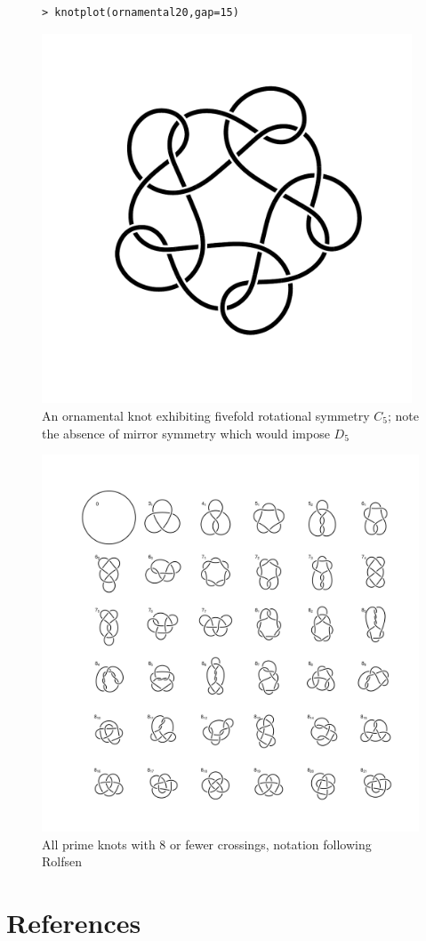 \documentclass{birkjour}
\theoremstyle{definition}
\theoremstyle{remark}
\numberwithin{equation}{section}
\begin{document}
\begin{figure}[htbp]
  \begin{center}
\begin{verbatim}
> knotplot(ornamental20,gap=15)
\end{verbatim}
\includegraphics[width=11cm]{knot-ornamental}
\caption{An ornamental knot exhibiting fivefold
  rotational \label{orn20} symmetry $C_5$; note the absence of mirror
  symmetry which would impose $D_5$}
  \end{center}
\end{figure}

\begin{figure}[htbp]
  \begin{center}
\includegraphics[width=13cm]{knots_to_8crossings}  %
\caption{All \label{all8} prime knots with 8 or fewer crossings,
notation following Rolfsen~\cite{rolfsen1976}}
  \end{center}
\end{figure}


\section*{References}



\end{document}
